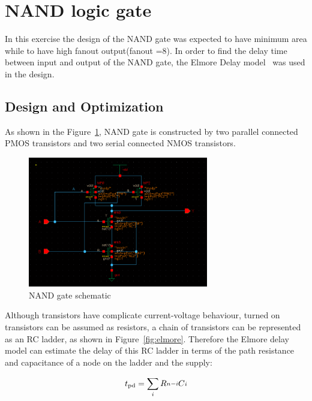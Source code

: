\section{NAND logic gate}
In this exercise the design of the NAND gate was expected to have minimum area while to have high fanout output(fanout =8). In order to find the delay time between input and output of the NAND gate, the Elmore Delay model~\cite{elmore1948transient} was used in the design.\\
\subsection{Design and Optimization}
As shown in the Figure~\ref{fig:nand}, NAND gate is constructed by two parallel connected PMOS transistors and two serial connected NMOS transistors. 

\begin{figure}[ht]
\centering
\includegraphics[width = 0.7\textwidth]{Figures/nand}
\caption{NAND gate schematic}
\label {fig:nand}
\end{figure}

Although transistors have complicate current-voltage behaviour, turned on transistors can be assumed as resistors, a chain of transistors can be represented as an RC ladder, as shown in Figure~\ref{fig:elmore}. Therefore the Elmore delay model can estimate the delay of this RC ladder in terms of the path resistance and capacitance of a node on the ladder and the supply:

\begin{align}
	{t\textsubscript{pd} = \sum_{\substack{i}} R\substack{n-i}C\substack{i}}
\end{align}

